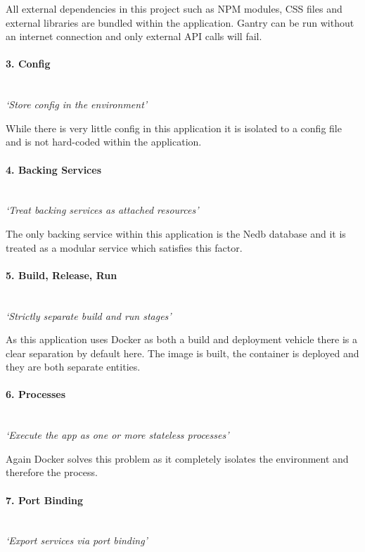 All external dependencies in this project such as NPM modules, \gls{CSS} files and external libraries are bundled within the application. Gantry can be run without an internet connection and only external API calls will fail.

\paragraph{3. Config}\mbox{}\\
\textit{`Store config in the environment'}

While there is very little config in this application it is isolated to a config file and is not hard-coded within the application.

\paragraph{4. Backing Services}\mbox{}\\
\textit{`Treat backing services as attached resources'}

The only backing service within this application is the Nedb database and it is treated as a modular service which satisfies this factor.

\paragraph{5. Build, Release, Run}\mbox{}\\
\textit{`Strictly separate build and run stages'}

As this application uses Docker as both a build and deployment vehicle there is a clear separation by default here. The image is built, the container is deployed and they are both separate entities.

\paragraph{6. Processes}\mbox{}\\
\textit{`Execute the app as one or more stateless processes'}

Again Docker solves this problem as it completely isolates the environment and therefore the process.

\paragraph{7. Port Binding}\mbox{}\\
\textit{`Export services via port binding'}

